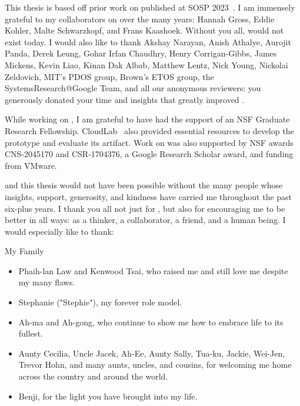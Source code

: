 %
This thesis is based off prior work on \sys published at SOSP 2023~\cite{edna}.
I am immensely grateful to my collaborators on \sys over the many years: Hannah
Gross, Eddie Kohler, Malte Schwarzkopf, and Frans Kaashoek. Without you all,
\sys would not exist today.
%
I would also like to thank Akshay Narayan, Anish Athalye, Aurojit Panda, Derek
Leung, Gohar Irfan Chaudhry, Henry Corrigan-Gibbs, James Mickens, Kevin Liao,
Kinan Dak Albab, Matthew Lentz, Nick Young, Nickolai Zeldovich, MIT's PDOS
group, Brown's ETOS group, the SystemsResearch@Google Team, and all our
anonymous reviewers: you generously donated your time and insights that greatly
improved \sys. 
%

%
While working on \sys, I am grateful to have had the support of an NSF Graduate
Research Fellowship.  CloudLab~\cite{cloudlab} also provided essential resources
to develop the \sys prototype and evaluate its artifact.
%
Work on \sys was also supported by NSF awards CNS-2045170 and CSR-1704376, a
Google Research Scholar award, and funding from VMware.
%

%
\sys and this thesis would not have been possible without the many people whose
insights, support, generosity, and kindness have carried me throughout the past
six-plus years.
%
I thank you all not just for \sys, but also for encouraging me to be better in
all ways: as a thinker, a collaborator, a friend, and a human being.
%
I would especially like to thank:

\begin{center}{My Family}\end{center}
    
    \begin{itemize}
    \item Phaih-lan Law and Kenwood Tsai, who raised me and still love me despite my many flaws. 
    
    \item Stephanie ("Stephie"), my forever role model. 
     
     \item Ah-ma and Ah-gong, who continue to show me how to embrace life to its fullest. 
        
    \item Aunty Cecilia, Uncle Jacek, Ah-Ee, Aunty
    Sally, Tua-ku, Jackie, Wei-Jen, Trevor Hohn, and many aunts, uncles, and
            cousins, for welcoming me home across the country and around the world.

    \item Benji, for the light you have brought into my life.
    \end{itemize}

